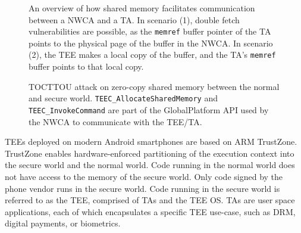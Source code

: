 \documentclass[letterpaper,twocolumn,10pt]{article}
\begin{document}
\begin{listing}[]
    \label{lst:exdf}
\end{listing}

\begin{figure}[h]
  \centering
  
  \caption{
    An overview of how shared memory facilitates communication between a NWCA and a TA.
    In scenario (1), double fetch vulnerabilities are possible, as the \texttt{memref} 
    buffer pointer of the TA points to the physical page of the buffer in the NWCA. 
    In scenario (2), the TEE makes a local copy of the buffer, and the TA's \texttt{memref} buffer 
    points to that local copy.
    }
  \label{fig:shmex}
\end{figure}

\begin{figure}[]
  \centering
  
  \caption{
    TOCTTOU attack on zero-copy shared memory between the normal and secure world.
    \texttt{TEEC\_AllocateSharedMemory} and \texttt{TEEC\_InvokeCommand} are part of the GlobalPlatform 
    API used by the NWCA to communicate with the TEE/TA.
    }
  \label{fig:tocttouex}
\end{figure}

TEEs deployed on modern Android smartphones are based on ARM TrustZone. 
TrustZone enables hardware-enforced partitioning of the execution context into 
the secure world and the normal world. Code running in the normal world does not 
have access to the memory of the secure world. Only code signed by the phone 
vendor runs in the secure world. Code running in the secure world is referred 
to as the TEE, comprised of TAs and the TEE OS. TAs are user space applications, 
each of which encapsulates a specific TEE use-case, such as DRM, digital 
payments, or biometrics.
\end{document}
